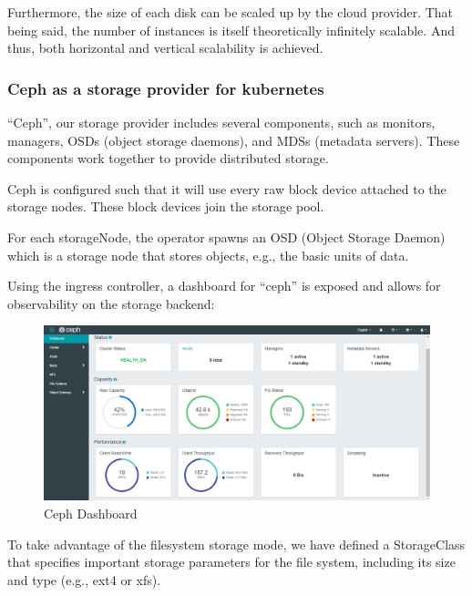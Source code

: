 \hspace{7mm}Furthermore, the size of each disk can be scaled up by the cloud provider. That being said, the number of instances is itself theoretically infinitely scalable. And thus, both horizontal and vertical scalability is achieved. 

\subsubsection{Ceph as a storage provider for kubernetes }

\hspace{7mm}“Ceph”, our storage provider includes several components, such as monitors, managers, OSDs (object storage daemons), and MDSs (metadata servers). These components work together to provide distributed storage.

\hspace{7mm}Ceph is configured such that it will use every raw block device attached to the storage nodes. These block devices join the storage pool.

\hspace{7mm}For each storageNode, the operator spawns an OSD (Object Storage Daemon) which is a storage node that stores objects, e.g., the basic units of data.

\hspace{7mm}Using the ingress controller, a dashboard for “ceph” is exposed and allows for observability on the storage backend: 
\begin{figure}[H]\centering
\includegraphics[width=1.0\textwidth,angle=00]{assets/f29.png}
\caption{Ceph Dashboard }
\label{fig:Ceph Dashboard }
\end{figure}


\hspace{7mm}To take advantage of the filesystem storage mode, we have defined a StorageClass that specifies important storage parameters for the file system, including its size and type (e.g., ext4 or xfs).


